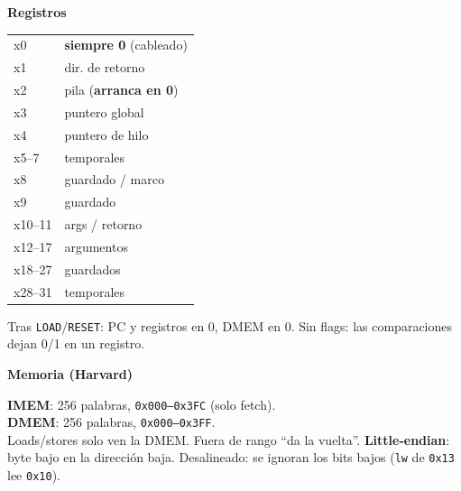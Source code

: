 \documentclass[9pt]{extarticle}
\newcommand{\mono}[1]{\texttt{#1}}
\newcommand{\seccion}[1]{{\color{acento}\bfseries\large #1}\par\vspace{1mm}}
\begin{document}
\vspace{2.5mm}
\begin{minipage}[t]{0.30\linewidth}
\seccion{Registros}
{\footnotesize\renewcommand{\arraystretch}{1.05}
\begin{tabular}{@{}>{\ttfamily}l l@{}}
x0      & \textbf{siempre 0} (cableado) \\
x1      & dir. de retorno \\
x2      & pila (\textbf{arranca en 0}) \\
x3      & puntero global \\
x4      & puntero de hilo \\
x5–7    & temporales \\
x8      & guardado / marco \\
x9      & guardado \\
x10–11  & args / retorno \\
x12–17  & argumentos \\
x18–27  & guardados \\
x28–31  & temporales \\
\end{tabular}}

\vspace{1.5mm}
{\footnotesize Tras \mono{LOAD}/\mono{RESET}: PC y registros en 0, DMEM en 0. Sin flags: las comparaciones dejan 0/1 en un registro.\par}

\vspace{2mm}
\seccion{Memoria (Harvard)}
{\footnotesize
\textbf{IMEM}: 256 palabras, \mono{0x000–0x3FC} (solo fetch).\\
\textbf{DMEM}: 256 palabras, \mono{0x000–0x3FF}.\\
Loads/stores solo ven la DMEM. Fuera de rango “da la vuelta”.
\textbf{Little-endian}: byte bajo en la dirección baja.
Desalineado: se ignoran los bits bajos (\mono{lw} de \mono{0x13} lee \mono{0x10}).\par}
\end{minipage}\hfill
\end{document}
